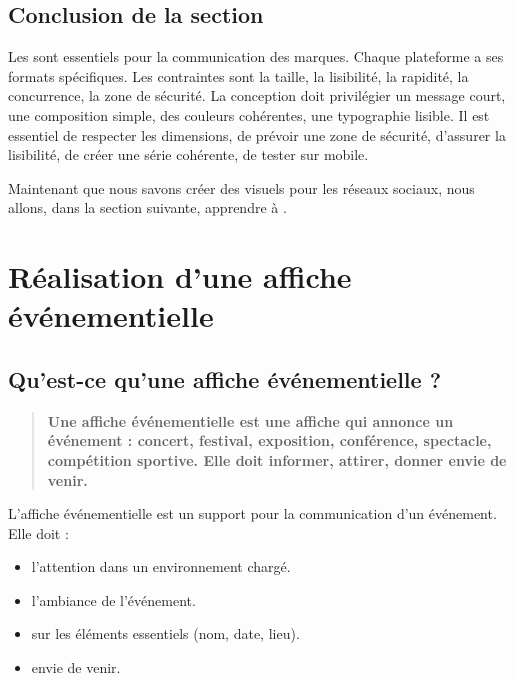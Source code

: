 \subsection*{Conclusion de la section}

Les  sont essentiels pour la communication des marques. Chaque plateforme a ses formats spécifiques. Les contraintes sont la taille, la lisibilité, la rapidité, la concurrence, la zone de sécurité. La conception doit privilégier un message court, une composition simple, des couleurs cohérentes, une typographie lisible. Il est essentiel de respecter les dimensions, de prévoir une zone de sécurité, d'assurer la lisibilité, de créer une série cohérente, de tester sur mobile.

Maintenant que nous savons créer des visuels pour les réseaux sociaux, nous allons, dans la section suivante, apprendre à .

\section{Réalisation d'une affiche événementielle}

\subsection{Qu'est-ce qu'une affiche événementielle ?}

\begin{quote}
\textbf{Une affiche événementielle est une affiche qui annonce un événement : concert, festival, exposition, conférence, spectacle, compétition sportive. Elle doit informer, attirer, donner envie de venir.}
\end{quote}

L'affiche événementielle est un support  pour la communication d'un événement. Elle doit :

\begin{itemize}
    \item {} l'attention dans un environnement chargé.
    \item {} l'ambiance de l'événement.
    \item {} sur les éléments essentiels (nom, date, lieu).
    \item {} envie de venir.
\end{itemize}

